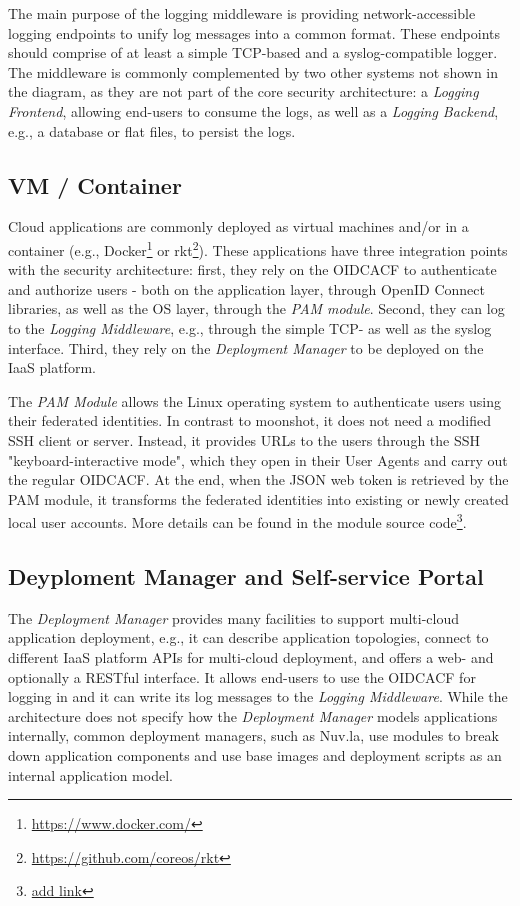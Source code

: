 \documentclass{llncs}
\begin{document}
The main purpose of the logging middleware is providing network-accessible logging endpoints to unify log messages into a common format. These endpoints should comprise of at least a simple TCP-based and a syslog-compatible logger. The middleware is commonly complemented by two other systems not shown in the diagram, as they are not part of the core security architecture: a \textit{Logging Frontend}, allowing end-users to consume the logs, as well as a \textit{Logging Backend}, e.g., a database or flat files, to persist the logs.

\subsection{VM / Container}

Cloud applications are commonly deployed as virtual machines and/or in a container (e.g., Docker\footnote{\url{https://www.docker.com/}} or rkt\footnote{\url{https://github.com/coreos/rkt}}). These applications have three integration points with the security architecture: first, they rely on the OIDCACF to authenticate and authorize users - both on the application layer, through OpenID Connect libraries, as well as the OS layer, through the \textit{PAM module}. Second, they can log to the \textit{Logging Middleware}, e.g., through the simple TCP- as well as the syslog interface. Third, they rely on the \textit{Deployment Manager} to be deployed on the IaaS platform.

The \textit{PAM Module} allows the Linux operating system to authenticate users using their federated identities. In contrast to moonshot, it does not need a modified SSH client or server. Instead, it provides URLs to the users through the SSH "keyboard-interactive mode", which they open in their User Agents and carry out the regular OIDCACF. At the end, when the JSON web token is retrieved by the PAM module, it transforms the federated identities into existing or newly created local user accounts. More details can be found in the module source code\footnote{\url{add link}}.

\subsection{Deyploment Manager and Self-service Portal}

The \textit{Deployment Manager} provides many facilities to support multi-cloud application deployment, e.g., it can describe application topologies, connect to different IaaS platform APIs for multi-cloud deployment, and offers a web- and optionally a RESTful interface. It allows end-users to use the OIDCACF for logging in and it can write its log messages to the \textit{Logging Middleware}. While the architecture does not specify how the \textit{Deployment Manager} models applications internally, common deployment managers, such as Nuv.la, use modules to break down application components and use base images and deployment scripts as an internal application model.
\end{document}

